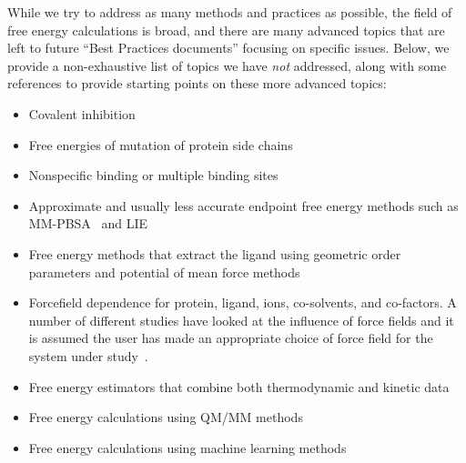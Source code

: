 \documentclass[9pt,bestpractices]{livecoms}
\begin{document}
While we try to address as many methods and practices as possible, the field of free energy calculations is broad, and there are many advanced topics that are left to future ``Best Practices documents'' focusing on specific issues. 
Below, we provide a non-exhaustive list of topics we have \emph{not} addressed, along with some references to provide starting points on these more advanced topics:
\begin{itemize}
\item Covalent inhibition~\cite{lameira2019predicting}
\item Free energies of mutation of protein side chains~\cite{gapsys2016accurate,aldeghi2018accurate}
\item Nonspecific binding or multiple binding sites~\cite{gill2018binding}
\item Approximate and usually less accurate endpoint free energy methods such as MM-PBSA~\cite{genheden2015mm} and LIE~\cite{gutierrez-de-teran2012linear}
\item Free energy methods that extract the ligand using geometric order parameters and potential of mean force methods~\cite{heinzelmann2017attachpullrelease}
\item Forcefield dependence for protein, ligand, ions, co-solvents, and co-factors. A number of different studies have looked at the influence of force fields and it is assumed the user has made an appropriate choice of force field for the system under study~\cite{loeffler2018reproducibility, vassetti2019assessment, lopes2015current, hahn2024current}. 
\item Free energy estimators that combine both thermodynamic and kinetic data~\cite{wu2016multiensemble, mey2014xtram, wu2014statistically}
\item Free energy calculations using QM/MM methods~\cite{beierlein2011simple,dybeck2016comparison,cave-ayland2015direct,Schoeller2023}
\item Free energy calculations using machine learning methods~\cite{rufa2020chemical, scheen2020hybrid, cole2020machine,Karwounopoulos2024}
\end{itemize}
\end{document}
